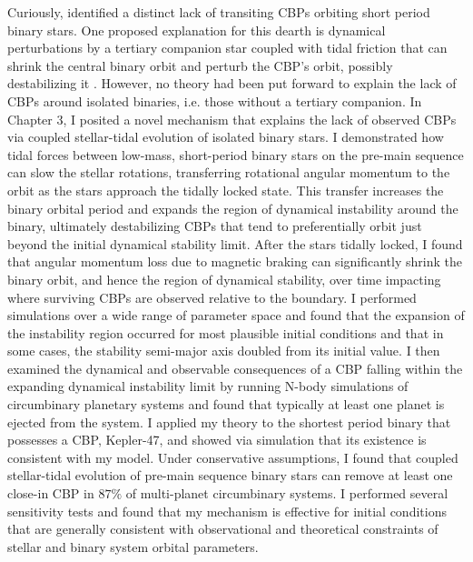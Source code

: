 Curiously, \kepler identified a distinct lack of transiting CBPs orbiting short period binary stars. One proposed explanation for this dearth is dynamical perturbations by a tertiary companion star coupled with tidal friction that can shrink the central binary orbit and perturb the CBP's orbit, possibly destabilizing it \citep{Munoz2015,Martin2015b,Hamers2016}.  However, no theory had been put forward to explain the lack of CBPs around isolated binaries, i.e. those without a tertiary companion. In Chapter 3, I posited a novel mechanism that explains the lack of observed CBPs via coupled stellar-tidal evolution of isolated binary stars. I demonstrated how tidal forces between low-mass, short-period binary stars on the pre-main sequence can slow the stellar rotations, transferring rotational angular momentum to the orbit as the stars approach the tidally locked state.  This transfer increases the binary orbital period and expands the region of dynamical instability around the binary, ultimately destabilizing CBPs that tend to preferentially orbit just beyond the initial dynamical stability limit.  After the stars tidally locked, I found that angular momentum loss due to magnetic braking can significantly shrink the binary orbit, and hence the region of dynamical stability, over time impacting where surviving CBPs are observed relative to the boundary.  I performed simulations over a wide range of parameter space and found that the expansion of the instability region occurred for most plausible initial conditions and that in some cases, the stability semi-major axis doubled from its initial value.  I then examined the dynamical and observable consequences of a CBP falling within the expanding dynamical instability limit by running N-body simulations of circumbinary planetary systems and found that typically at least one planet is ejected from the system.  I applied my theory to the shortest period \kepler binary that possesses a CBP, Kepler-47, and showed via simulation that its existence is consistent with my model.  Under conservative assumptions, I found that coupled stellar-tidal evolution of pre-main sequence binary stars can remove at least one close-in CBP in $87\%$ of multi-planet circumbinary systems. I performed several sensitivity tests and found that my mechanism is effective for initial conditions that are generally consistent with observational and theoretical constraints of stellar and binary system orbital parameters. 


